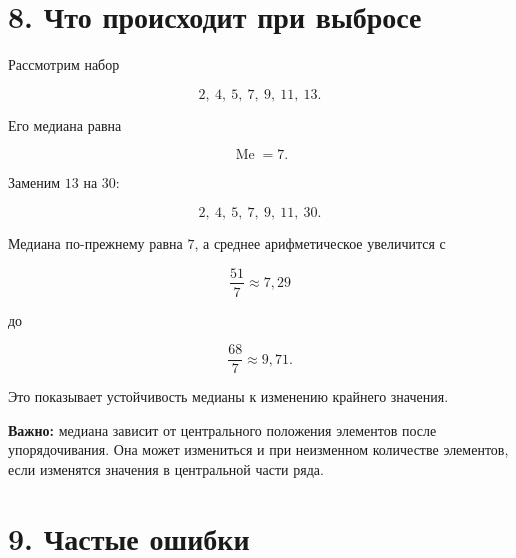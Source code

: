 \documentclass[a4paper,12pt]{article}
\newcommand{\key}[1]{\textcolor{darkaccent}{\textbf{#1}}}
\newcommand{\Me}{\operatorname{Me}}
\begin{document}
\section*{8. Что происходит при выбросе}

Рассмотрим набор

\[
2,\ 4,\ 5,\ 7,\ 9,\ 11,\ 13.
\]

Его медиана равна

\[
\Me=7.
\]

Заменим $13$ на $30$:

\[
2,\ 4,\ 5,\ 7,\ 9,\ 11,\ 30.
\]

Медиана по-прежнему равна $7$, а среднее арифметическое увеличится с

\[
\frac{51}{7}\approx7{,}29
\]

до

\[
\frac{68}{7}\approx9{,}71.
\]

Это показывает устойчивость медианы к изменению крайнего значения.

\key{Важно:} медиана зависит от центрального положения элементов после упорядочивания. Она может измениться и при неизменном количестве элементов, если изменятся значения в центральной части ряда.

\section*{9. Частые ошибки}
\end{document}
